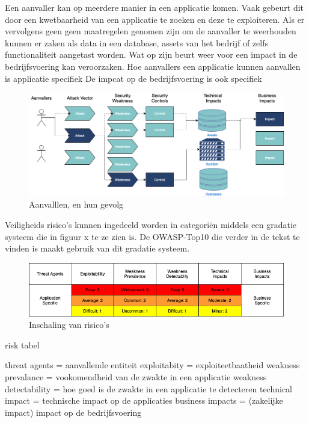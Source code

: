 Een aanvaller kan op meerdere manier in een applicatie komen. Vaak gebeurt dit door een kwetbaarheid van een applicatie te zoeken en deze te exploiteren. Als er vervolgens geen geen maatregelen genomen zijn om de aanvaller te weerhouden kunnen er zaken als data in een database, assets van het bedrijf of zelfs functionaliteit aangetast worden. Wat op zijn beurt weer voor een impact in de bedrijfsvoering kan veroorzaken. Hoe aanvallers een applicatie kunnen aanvallen is applicatie specifiek De impcat op de bedrijfsvoering is ook specifiek
\begin{figure}[h!]
\myfloatalign
\includegraphics[width=15cm]{gfx/application security routes}
\caption{Aanvalllen, en hun gevolg}
\label{fig:Appliction Security Routes}
\end{figure}

Veiligheids risico's kunnen ingedeeld worden in categori\"en middels een gradatie systeem die in figuur x te ze zien is. De OWASP-Top10 die verder in de tekst te vinden is maakt gebruik van dit gradatie systeem.
\begin{figure}[h!]
\myfloatalign
\includegraphics[width=12cm]{gfx/risk tabel}
\caption{Inschaling van risico's}
\label{fig:Appliction Security Routes}
\end{figure}

risk tabel

threat agents = aanvallende entiteit
exploitabity = exploiteetbaatheid
weakness prevalance = vookomendheid van de zwakte in een applicatie
weakness detectability = hoe goed is de zwakte in een applicatie te detecteren
technical impact = technische impact op de applicaties
business impacts = (zakelijke impact) impact op de bedrijfsvoering





